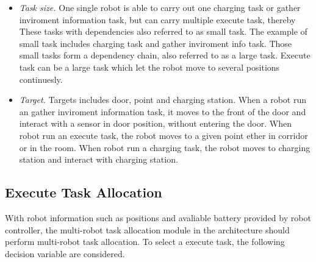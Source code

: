 \begin{table}[htb]
\centering
{}
\caption{Task arributes part 2}
\label{tab:task_attributes_common}
\end{table}


\begin{table}[htb]
\centering
{}
\caption{Task Table in Database}
\label{tab:task_table}
\end{table}

\begin{itemize}
	\item \textsl{Task size.} One single robot is able to carry out one charging task or gather inviroment information task, but can carry multiple execute task, thereby 
	These tasks with dependencies also referred to as small task. The example of small task includes charging task and gather inviroment info task. 
	Those small tasks form a dependency chain, also referred to as a large task. Execute task can be a large task which let the robot move to several positions continuesly.
	\item \textsl{Target.} Targets includes door, point and charging station. When a robot run an gather inviroment information task, it moves to the front of the door and interact with a sensor in door position, without entering the door. 
	When robot run an execute task, the robot moves to a given point ether in corridor or in the room.
	When robot run a charging task, the robot moves to charging station and interact with charging station.
\end{itemize}

\subsection{Execute Task Allocation}
With robot information such as positions and avaliable battery provided by robot controller, the multi-robot task allocation module in the architecture should perform multi-robot task allocation. To select a execute task, the following decision variable are considered.
